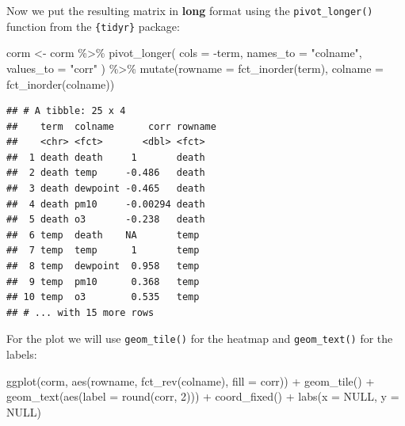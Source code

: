 \documentclass[
]{krantz}
\makeatletter
\newenvironment{Shaded}{\begin{snugshade}}{\end{snugshade}}
\newcommand{\AttributeTok}[1]{\textcolor[rgb]{0.61,0.61,0.61}{#1}}
\newcommand{\ConstantTok}[1]{\textcolor[rgb]{0,0,0}{#1}}
\newcommand{\DecValTok}[1]{\textcolor[rgb]{0.06,0.06,0.06}{#1}}
\newcommand{\FunctionTok}[1]{\textcolor[rgb]{0,0,0}{#1}}
\newcommand{\NormalTok}[1]{#1}
\newcommand{\OtherTok}[1]{\textcolor[rgb]{0.37,0.37,0.37}{#1}}
\newcommand{\SpecialCharTok}[1]{\textcolor[rgb]{0,0,0}{#1}}
\newcommand{\StringTok}[1]{\textcolor[rgb]{0.5,0.5,0.5}{#1}}
\newenvironment{kframe}{%
\medskip{}
\setlength{\fboxsep}{.8em}
 \def\at@end@of@kframe{}%
 \ifinner\ifhmode%
  \def\at@end@of@kframe{\end{minipage}}%
  \begin{minipage}{\columnwidth}%
 \fi\fi%
 \def\FrameCommand##1{\hskip\@totalleftmargin \hskip-\fboxsep
 \colorbox{shadecolor}{##1}\hskip-\fboxsep
     \hskip-\linewidth \hskip-\@totalleftmargin \hskip\columnwidth}%
 \MakeFramed {\advance\hsize-\width
   \@totalleftmargin\z@ \linewidth\hsize
   \@setminipage}}%
 {\par\unskip\endMakeFramed%
 \at@end@of@kframe}
\renewenvironment{Shaded}{\begin{kframe}}{\end{kframe}}
\makeatother
\begin{document}
Now we put the resulting matrix in \textbf{long} format using the \texttt{pivot\_longer()} function from the \texttt{\{tidyr\}} package:

\begin{Shaded}
\begin{Highlighting}[]
\NormalTok{corm }\OtherTok{\textless{}{-}}\NormalTok{ corm }\SpecialCharTok{\%\textgreater{}\%}
  \FunctionTok{pivot\_longer}\NormalTok{(}
    \AttributeTok{cols =} \SpecialCharTok{{-}}\NormalTok{term,}
    \AttributeTok{names\_to =} \StringTok{"colname"}\NormalTok{,}
    \AttributeTok{values\_to =} \StringTok{"corr"}
\NormalTok{  ) }\SpecialCharTok{\%\textgreater{}\%}
  \FunctionTok{mutate}\NormalTok{(}\AttributeTok{rowname =} \FunctionTok{fct\_inorder}\NormalTok{(term),}
         \AttributeTok{colname =} \FunctionTok{fct\_inorder}\NormalTok{(colname))}
\end{Highlighting}
\end{Shaded}

\begin{verbatim}
## # A tibble: 25 x 4
##    term  colname      corr rowname
##    <chr> <fct>       <dbl> <fct>  
##  1 death death     1       death  
##  2 death temp     -0.486   death  
##  3 death dewpoint -0.465   death  
##  4 death pm10     -0.00294 death  
##  5 death o3       -0.238   death  
##  6 temp  death    NA       temp   
##  7 temp  temp      1       temp   
##  8 temp  dewpoint  0.958   temp   
##  9 temp  pm10      0.368   temp   
## 10 temp  o3        0.535   temp   
## # ... with 15 more rows
\end{verbatim}

For the plot we will use \texttt{geom\_tile()} for the heatmap and \texttt{geom\_text()} for the labels:

\begin{Shaded}
\begin{Highlighting}[]
\FunctionTok{ggplot}\NormalTok{(corm, }\FunctionTok{aes}\NormalTok{(rowname, }\FunctionTok{fct\_rev}\NormalTok{(colname),}
                 \AttributeTok{fill =}\NormalTok{ corr)) }\SpecialCharTok{+}
  \FunctionTok{geom\_tile}\NormalTok{() }\SpecialCharTok{+}
  \FunctionTok{geom\_text}\NormalTok{(}\FunctionTok{aes}\NormalTok{(}\AttributeTok{label =} \FunctionTok{round}\NormalTok{(corr, }\DecValTok{2}\NormalTok{))) }\SpecialCharTok{+}
  \FunctionTok{coord\_fixed}\NormalTok{() }\SpecialCharTok{+}
  \FunctionTok{labs}\NormalTok{(}\AttributeTok{x =} \ConstantTok{NULL}\NormalTok{, }\AttributeTok{y =} \ConstantTok{NULL}\NormalTok{)}
\end{Highlighting}
\end{Shaded}
\end{document}
